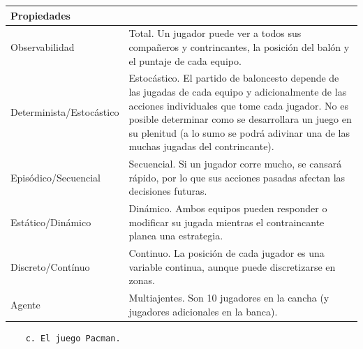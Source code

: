 \documentclass[11pt]{article}
\begin{document}
\begin{longtable}[]{@{}
  >{\raggedright\arraybackslash}p{}
  >{\raggedright\arraybackslash}p{}@{}}
\toprule\noalign{}
\begin{minipage}[b]{\linewidth}\raggedright
Propiedades
\end{minipage} & \begin{minipage}[b]{\linewidth}\raggedright
\end{minipage} \\
\midrule\noalign{}
\endhead
\bottomrule\noalign{}
\endlastfoot
Observabilidad & Total. Un jugador puede ver a todos sus compañeros y
contrincantes, la posición del balón y el puntaje de cada equipo. \\
Determinista/Estocástico & Estocástico. El partido de baloncesto depende
de las jugadas de cada equipo y adicionalmente de las acciones
individuales que tome cada jugador. No es posible determinar como se
desarrollara un juego en su plenitud (a lo sumo se podrá adivinar una de
las muchas jugadas del contrincante). \\
Episódico/Secuencial & Secuencial. Si un jugador corre mucho, se cansará
rápido, por lo que sus acciones pasadas afectan las decisiones
futuras. \\
Estático/Dinámico & Dinámico. Ambos equipos pueden responder o modificar
su jugada mientras el contraincante planea una estrategia. \\
Discreto/Contínuo & Continuo. La posición de cada jugador es una
variable continua, aunque puede discretizarse en zonas. \\
Agente & Multiajentes. Son 10 jugadores en la cancha (y jugadores
adicionales en la banca). \\
\end{longtable}

\begin{verbatim}
    c. El juego Pacman.
\end{verbatim}
\end{document}
